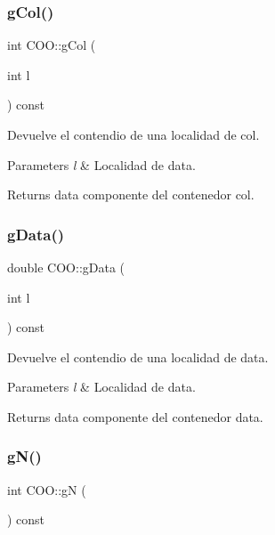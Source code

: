 \subsubsection{\texorpdfstring{g\+Col()}{gCol()}}
{\footnotesize\ttfamily int C\+O\+O\+::g\+Col (\begin{DoxyParamCaption}\item[{int}]{l }\end{DoxyParamCaption}) const\hspace{0.3cm}{\ttfamily [inline]}}



Devuelve el contendio de una localidad de col. 


\begin{DoxyParams}{Parameters}
{\em l} & Localidad de data. \\
\hline
\end{DoxyParams}
\begin{DoxyReturn}{Returns}
data componente del contenedor col. 
\end{DoxyReturn}
\hypertarget{class_c_o_o_af6e823999338171d1da2e434a89ef5d0}{}\label{class_c_o_o_af6e823999338171d1da2e434a89ef5d0} 
\subsubsection{\texorpdfstring{g\+Data()}{gData()}}
{\footnotesize\ttfamily double C\+O\+O\+::g\+Data (\begin{DoxyParamCaption}\item[{int}]{l }\end{DoxyParamCaption}) const\hspace{0.3cm}{\ttfamily [inline]}}



Devuelve el contendio de una localidad de data. 


\begin{DoxyParams}{Parameters}
{\em l} & Localidad de data. \\
\hline
\end{DoxyParams}
\begin{DoxyReturn}{Returns}
data componente del contenedor data. 
\end{DoxyReturn}
\hypertarget{class_c_o_o_a58c17d489f68d78f7f9c948a01ec93de}{}\label{class_c_o_o_a58c17d489f68d78f7f9c948a01ec93de} 
\subsubsection{\texorpdfstring{g\+N()}{gN()}}
{\footnotesize\ttfamily int C\+O\+O\+::gN (\begin{DoxyParamCaption}{ }\end{DoxyParamCaption}) const\hspace{0.3cm}{\ttfamily [inline]}}



